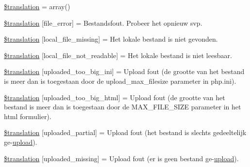 \begin{DoxyCompactItemize}
\item 
\hyperlink{class_8upload_8nl___n_l_8php_a1f198d410fecc3871ebdd468d343a5e3}{\$translation} = array()
\item 
\hyperlink{class_8upload_8nl___n_l_8php_ac7498e49b9771b04698029aa61c70821}{\$translation} \mbox{[}\textquotesingle{}file\+\_\+error\textquotesingle{}\mbox{]} = \textquotesingle{}Bestandsfout. Probeer het opnieuw svp.\textquotesingle{}
\item 
\hyperlink{class_8upload_8nl___n_l_8php_a6ec3d3a47ab70d77e7aa593e82ead10e}{\$translation} \mbox{[}\textquotesingle{}local\+\_\+file\+\_\+missing\textquotesingle{}\mbox{]} = \textquotesingle{}Het lokale bestand is niet gevonden.\textquotesingle{}
\item 
\hyperlink{class_8upload_8nl___n_l_8php_a60104befef9b241f3a7a6a755618a4b3}{\$translation} \mbox{[}\textquotesingle{}local\+\_\+file\+\_\+not\+\_\+readable\textquotesingle{}\mbox{]} = \textquotesingle{}Het lokale bestand is niet leesbaar.\textquotesingle{}
\item 
\hyperlink{class_8upload_8nl___n_l_8php_a6a08dcd0d3651fdd098568f6b2f0a42c}{\$translation} \mbox{[}\textquotesingle{}uploaded\+\_\+too\+\_\+big\+\_\+ini\textquotesingle{}\mbox{]} = \textquotesingle{}Upload fout (de grootte van het bestand is meer dan is toegestaan door de upload\+\_\+max\+\_\+filesize parameter in php.\+ini).\textquotesingle{}
\item 
\hyperlink{class_8upload_8nl___n_l_8php_a623d5b8b92169f57d7e43458aa911cbb}{\$translation} \mbox{[}\textquotesingle{}uploaded\+\_\+too\+\_\+big\+\_\+html\textquotesingle{}\mbox{]} = \textquotesingle{}Upload fout (de grootte van het bestand is meer dan is toegestaan door de M\+A\+X\+\_\+\+F\+I\+L\+E\+\_\+\+S\+I\+Z\+E parameter in het html formulier).\textquotesingle{}
\item 
\hyperlink{class_8upload_8nl___n_l_8php_a967c17da21b0a2d3bd65cca3a9ca0ea8}{\$translation} \mbox{[}\textquotesingle{}uploaded\+\_\+partial\textquotesingle{}\mbox{]} = \textquotesingle{}Upload fout (het bestand is slechts gedeeltelijk ge-\/\hyperlink{classupload}{upload}).\textquotesingle{}
\item 
\hyperlink{class_8upload_8nl___n_l_8php_a0cce433260be65f1f35853a6b4b8952b}{\$translation} \mbox{[}\textquotesingle{}uploaded\+\_\+missing\textquotesingle{}\mbox{]} = \textquotesingle{}Upload fout (er is geen bestand ge-\/\hyperlink{classupload}{upload}).\textquotesingle{}
\item 

\end{DoxyCompactItemize}
